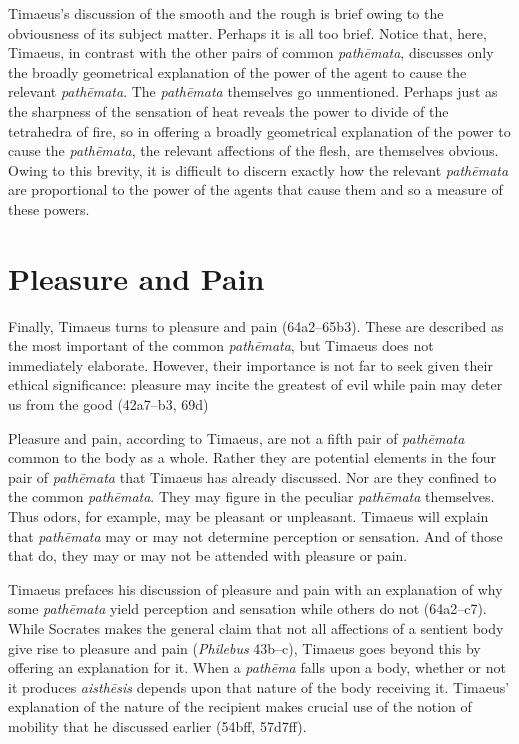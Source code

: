 Timaeus's discussion of the smooth and the rough is brief owing to the obviousness of its subject matter. Perhaps it is all too brief. Notice that, here, Timaeus, in contrast with the other pairs of common \emph{pathēmata}, discusses only the broadly geometrical explanation of the power of the agent to cause the relevant \emph{pathēmata}. The \emph{pathēmata} themselves go unmentioned. Perhaps just as the sharpness of the sensation of heat reveals the power to divide of the tetrahedra of fire, so in offering a broadly geometrical explanation of the power to cause the \emph{pathēmata}, the relevant affections of the flesh, are themselves obvious. Owing to this brevity, it is difficult to discern exactly how the relevant \emph{pathēmata} are proportional to the power of the agents that cause them and so a measure of these powers.


\section{Pleasure and Pain} %
\label{sec:pleasure_and_pain}

Finally, Timaeus turns to pleasure and pain (64a2–65b3). These are described as the most important of the common \emph{pathēmata}, but Timaeus does not immediately elaborate. However, their importance is not far to seek given their ethical significance: pleasure may incite the greatest of evil while pain may deter us from the good (42a7--b3, 69d)

Pleasure and pain, according to Timaeus, are not a fifth pair of \emph{pathēmata} common to the body as a whole. Rather they are potential elements in the four pair of \emph{pathēmata} that Timaeus has already discussed. Nor are they confined to the common \emph{pathēmata}. They may figure in the peculiar \emph{pathēmata} themselves. Thus odors, for example, may be pleasant or unpleasant. Timaeus will explain that \emph{pathēmata} may or may not determine perception or sensation. And of those that do, they may or may not be attended with pleasure or pain.

Timaeus prefaces his discussion of pleasure and pain with an explanation of why some \emph{pathēmata} yield perception and sensation while others do not (64a2--c7). While Socrates makes the general claim that not all affections of a sentient body give rise to pleasure and pain (\emph{Philebus} 43b--c), Timaeus goes beyond this by offering an explanation for it.  When a \emph{pathēma} falls upon a body, whether or not it produces \emph{aisthēsis} depends upon that nature of the body receiving it. Timaeus' explanation of the nature of the recipient makes crucial use of the notion of mobility that he discussed earlier (54bff, 57d7ff). 

